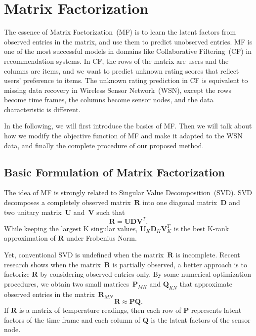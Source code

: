 \section{Matrix Factorization}  \label{sec:mf}


The essence of Matrix Factorization~(MF) is to learn the latent factors from observed entries in the matrix, and use them to predict unobserved entries. MF is one of the most successful models in domains like Collaborative Filtering~(CF) in recommendation systems. In CF, the rows of the matrix are users and the columns are items, and we want to predict unknown rating scores that reflect users' preference to items. The unknown rating prediction in CF is equivalent to missing data recovery in Wireless Sensor Network~(WSN), except the rows become time frames, the columns become sensor nodes, and the data characteristic is different. 

In the following, we will first introduce the basics of MF. Then we will talk about how we modify the objective function of MF and make it adapted to the WSN data, and finally the complete procedure of our proposed method.

\subsection{Basic Formulation of Matrix Factorization}

The idea of MF is strongly related to Singular Value Decomposition~(SVD). SVD decomposes a completely observed matrix~$\mathbf{R}$ into one diagonal matrix~$\mathbf{D}$ and two unitary matrix~$\mathbf{U}$ and~$\mathbf{V}$ such that
\begin{equation*} \mathbf{R} = \mathbf{U}\mathbf{D}\mathbf{V}^T. \end{equation*}
While keeping the largest K singular values, $\mathbf{U}_K \mathbf{D}_K \mathbf{V}_K^T$ is the best K-rank approximation of $\mathbf{R}$ under Frobenius Norm. 

Yet, conventional SVD is undefined when the matrix~$\mathbf{R}$ is incomplete. Recent research shows\cite{koren2009matrix} when the matrix~$\mathbf{R}$ is partially observed, a better approach is to factorize $\mathbf{R}$ by considering observed entries only. By some numerical optimization procedures, we obtain two small matrices~$\mathbf{P}_{MK}$ and $\mathbf{Q}_{KN}$ that approximate observed entries in the matrix~$\mathbf{R}_{MN}$
\begin{equation*}\mathbf{R} \approx \mathbf{P} \mathbf{Q}.\end{equation*}
If $\mathbf{R}$ is a matrix of temperature readings, then each row of $\mathbf{P}$ represents latent factors of the time frame and each column of $\mathbf{Q}$ is the latent factors of the sensor node.

